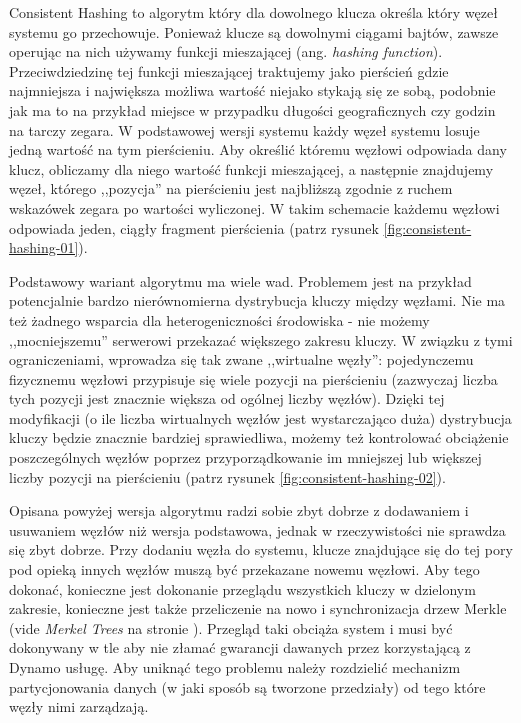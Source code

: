 Consistent Hashing to algorytm który dla dowolnego klucza określa który węzeł systemu go przechowuje.
Ponieważ klucze są dowolnymi ciągami bajtów, zawsze operując na nich używamy funkcji mieszającej (ang. \emph{hashing function}).
Przeciwdziedzinę tej funkcji mieszającej traktujemy jako pierścień gdzie najmniejsza i największa możliwa wartość niejako stykają się ze sobą, podobnie jak ma to na przykład miejsce w przypadku długości geograficznych czy godzin na tarczy zegara.
W podstawowej wersji systemu każdy węzeł systemu losuje jedną wartość na tym pierścieniu.
Aby określić któremu węzłowi odpowiada dany klucz, obliczamy dla niego wartość funkcji mieszającej, a następnie znajdujemy węzeł, którego ,,pozycja'' na pierścieniu jest najbliższą zgodnie z ruchem wskazówek zegara po wartości wyliczonej.
W takim schemacie każdemu węzłowi odpowiada jeden, ciągły fragment pierścienia (patrz rysunek \ref{fig:consistent-hashing-01}).


Podstawowy wariant algorytmu ma wiele wad.
Problemem jest na przykład potencjalnie bardzo nierównomierna dystrybucja kluczy między węzłami.
Nie ma też żadnego wsparcia dla heterogeniczności środowiska - nie możemy ,,mocniejszemu'' serwerowi przekazać większego zakresu kluczy.
W związku z tymi ograniczeniami, wprowadza się tak zwane ,,wirtualne węzły'': pojedynczemu fizycznemu węzłowi przypisuje się wiele pozycji na pierścieniu (zazwyczaj liczba tych pozycji jest znacznie większa od ogólnej liczby węzłów).
Dzięki tej modyfikacji (o ile liczba wirtualnych węzłów jest wystarczająco duża) dystrybucja kluczy będzie znacznie bardziej sprawiedliwa, możemy też kontrolować obciążenie poszczególnych węzłów poprzez przyporządkowanie im mniejszej lub większej liczby pozycji na pierścieniu (patrz rysunek \ref{fig:consistent-hashing-02}).


Opisana powyżej wersja algorytmu radzi sobie zbyt dobrze z dodawaniem i usuwaniem węzłów niż wersja podstawowa, jednak w rzeczywistości nie sprawdza się zbyt dobrze.
Przy dodaniu węzła do systemu, klucze znajdujące się do tej pory pod opieką innych węzłów muszą być przekazane nowemu węzłowi.
Aby tego dokonać, konieczne jest dokonanie przeglądu wszystkich kluczy w dzielonym zakresie, konieczne jest także przeliczenie na nowo i synchronizacja drzew Merkle (vide \emph{Merkel Trees} na stronie \pageref{merkle-trees}). 
Przegląd taki obciąża system i musi być dokonywany w tle aby nie złamać gwarancji dawanych przez korzystającą z Dynamo usługę.
Aby uniknąć tego problemu należy rozdzielić mechanizm partycjonowania danych (w jaki sposób są tworzone przedziały) od tego które węzły nimi zarządzają.

